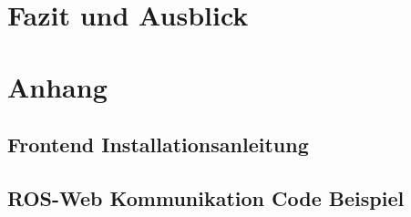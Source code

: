 \documentclass[11pt,oneside,a4paper,titlepage]{article}
\begin{document}
\section{Fazit und Ausblick}

\section{Anhang}
\subsection{Frontend Installationsanleitung}


\subsection{ROS-Web Kommunikation Code Beispiel}


\newpage


\end{document}
